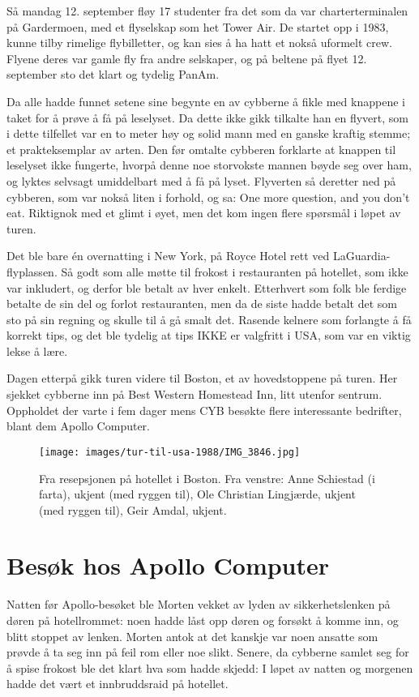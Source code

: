 Så mandag 12. september fløy 17 studenter fra det som da var charterterminalen på Gardermoen, med et flyselskap som het Tower Air. De startet opp i 1983, kunne tilby rimelige flybilletter, og kan sies å ha hatt et nokså uformelt crew. Flyene deres var gamle fly fra andre selskaper, og på beltene på flyet 12. september sto det klart og tydelig PanAm.

Da alle hadde funnet setene sine begynte en av cybberne å fikle med knappene i taket for å prøve å få på leselyset. Da dette ikke gikk tilkalte han en flyvert, som i dette tilfellet var en to meter høy og solid mann med en ganske kraftig stemme; et prakteksemplar av arten. Den før omtalte cybberen forklarte at knappen til leselyset ikke fungerte, hvorpå denne noe storvokste mannen bøyde seg over ham, og lyktes selvsagt umiddelbart med å få på lyset. Flyverten så deretter ned på cybberen, som var nokså liten i forhold, og sa: One more question, and you don't eat. Riktignok med et glimt i øyet, men det kom ingen flere spørsmål i løpet av turen.

Det ble bare én overnatting i New York, på Royce Hotel rett ved LaGuardia-flyplassen. Så godt som alle møtte til frokost i restauranten på hotellet, som ikke var inkludert, og derfor ble betalt av hver enkelt. Etterhvert som folk ble ferdige betalte de sin del og forlot restauranten, men da de siste hadde betalt det som sto på sin regning og skulle til å gå smalt det. Rasende kelnere som forlangte å få korrekt tips, og det ble tydelig at tips IKKE er valgfritt i USA, som var en viktig lekse å lære.

Dagen etterpå gikk turen videre til Boston, et av hovedstoppene på turen. Her sjekket cybberne inn på Best Western Homestead Inn, litt utenfor sentrum. Oppholdet der varte i fem dager mens CYB besøkte flere interessante bedrifter, blant dem Apollo Computer. 

\begin{figure}
	\texttt{[image: images/tur-til-usa-1988/IMG\_3846.jpg]}
	\caption{Fra resepsjonen på hotellet i Boston. Fra venstre: Anne Schiestad (i farta), ukjent (med ryggen til), Ole Christian Lingjærde, ukjent (med ryggen til), Geir Amdal, ukjent.}
\end{figure}

\section{Besøk hos Apollo Computer}

Natten før Apollo-besøket ble Morten vekket av lyden av sikkerhetslenken på døren på hotellrommet: noen hadde låst opp døren og forsøkt å komme inn, og blitt stoppet av lenken. Morten antok at det kanskje var noen ansatte som prøvde å ta seg inn på feil rom eller noe slikt. Senere, da cybberne samlet seg for å spise frokost ble det klart hva som hadde skjedd: I løpet av natten og morgenen hadde det vært et innbruddsraid på hotellet.

